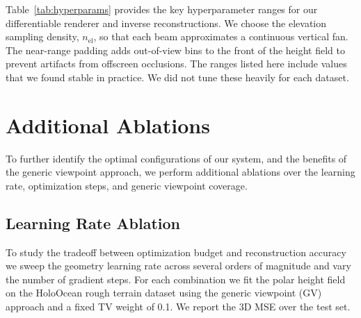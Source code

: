 Table~\ref{tab:hyperparams} provides the key hyperparameter ranges for our differentiable renderer and inverse reconstructions. We choose the elevation sampling density, \(n_\text{el}\), so that each beam approximates a continuous vertical fan. The near-range padding adds out-of-view bins to the front of the height field to prevent artifacts from offscreen occlusions. The ranges listed here include values that we found stable in practice. We did not tune these heavily for each dataset.


\section{Additional Ablations}
\label{sec:more_ablations}
To further identify the optimal configurations of our system, and the benefits of the generic viewpoint approach, we perform additional ablations over the learning rate, optimization steps, and generic viewpoint coverage.

\subsection{Learning Rate Ablation}
\label{sec:lr_ablate}

To study the tradeoff between optimization budget and reconstruction accuracy we sweep the geometry learning rate across several orders of magnitude and vary the number of gradient steps. For each combination we fit the polar height field on the HoloOcean rough terrain dataset using the generic viewpoint (GV) approach and a fixed TV weight of \num{0.1}. We report the 3D MSE over the test set.

